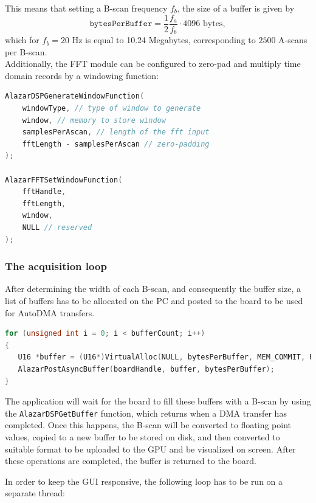 This means that setting a B-scan frequency $f_b$, the size of a buffer is given by
\begin{equation}\label{eq:bytesperbuffer}
	\texttt{bytesPerBuffer} = \frac{1}{2} \frac{f_a}{f_b} \cdot 4096 \text{ bytes},
\end{equation}
which for $f_b = 20$ Hz is equal to 10.24 Megabytes, corresponding to $2500$ A-scans per B-scan.\\

Additionally, the FFT module can be configured to zero-pad and multiply time domain records by a windowing function:
\begin{lstlisting}[language=C,frame=tb]
AlazarDSPGenerateWindowFunction(
	windowType, // type of window to generate
	window, // memory to store window
	samplesPerAscan, // length of the fft input
	fftLength - samplesPerAscan	// zero-padding
);

AlazarFFTSetWindowFunction(
	fftHandle,
	fftLength,
	window,
	NULL // reserved 
);
\end{lstlisting}

\subsubsection{The acquisition loop}
After determining the width of each B-scan, and consequently the buffer size, a list of buffers has to be allocated on the PC and posted to the board to be used for AutoDMA transfers. 

\begin{lstlisting}[language=C,frame=tb]
for (unsigned int i = 0; i < bufferCount; i++)
{
   U16 *buffer = (U16*)VirtualAlloc(NULL, bytesPerBuffer, MEM_COMMIT, PAGE_READWRITE);
   AlazarPostAsyncBuffer(boardHandle, buffer, bytesPerBuffer);
}
\end{lstlisting}

The application will wait for the board to fill these buffers with a B-scan by using the \texttt{AlazarDSPGetBuffer} function, which returns when a DMA transfer has completed. Once this happens, the B-scan will be converted to floating point values, copied to a new buffer to be stored on disk, and then converted to suitable format to be uploaded to the GPU and be visualized on screen. After these operations are completed, the buffer is returned to the board. 

In order to keep the GUI responsive, the following loop has to be run on a separate thread:

